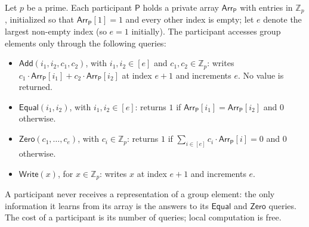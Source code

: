\documentclass{conjura-conjecture}
\newcommand{\Zp}{\mathbb{Z}_{p}}
\newcommand{\Add}{\mathsf{Add}}
\newcommand{\Zero}{\mathsf{Zero}}
\newcommand{\Equal}{\mathsf{Equal}}
\newcommand{\WriteQ}{\mathsf{Write}}
\newcommand{\Arr}{\mathsf{Arr}}
\newcommand{\Pty}{\mathsf{P}}
\begin{document}
\begin{definition}\label{def:mggm}
Let $p$ be a prime. Each participant $\Pty$ holds a private array
$\Arr_{\Pty}$ with entries in $\Zp$, initialized so that
$\Arr_{\Pty}[1] = 1$ and every other index is empty; let $e$ denote the
largest non-empty index (so $e = 1$ initially). The participant accesses
group elements only through the following queries:
\begin{itemize}
  \item $\Add(i_{1}, i_{2}, c_{1}, c_{2})$, with $i_{1}, i_{2} \in [e]$
    and $c_{1}, c_{2} \in \Zp$: writes
    $c_{1} \cdot \Arr_{\Pty}[i_{1}] + c_{2} \cdot \Arr_{\Pty}[i_{2}]$ at
    index $e+1$ and increments $e$. No value is returned.
  \item $\Equal(i_{1}, i_{2})$, with $i_{1}, i_{2} \in [e]$: returns $1$
    if $\Arr_{\Pty}[i_{1}] = \Arr_{\Pty}[i_{2}]$ and $0$ otherwise.
  \item $\Zero(c_{1},\dots,c_{e})$, with $c_{i} \in \Zp$: returns $1$ if
    $\sum_{i \in [e]} c_{i} \cdot \Arr_{\Pty}[i] = 0$ and $0$ otherwise.
  \item $\WriteQ(x)$, for $x \in \Zp$: writes $x$ at index $e+1$ and
    increments $e$.
\end{itemize}
A participant never receives a representation of a group element: the
only information it learns from its array is the answers to its $\Equal$
and $\Zero$ queries. The cost of a participant is its number of queries;
local computation is free.
\end{definition}
\end{document}
